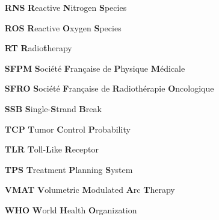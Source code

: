 \begin{itemize}
	\item[\textbf{RNS}] \textbf{R}eactive \textbf{N}itrogen \textbf{S}pecies
	\item[\textbf{ROS}] \textbf{R}eactive \textbf{O}xygen \textbf{S}pecies
	\item[\textbf{RT}] \textbf{R}adio\textbf{t}herapy
	\item[\textbf{SFPM}] \textbf{S}ociété \textbf{F}rançaise de \textbf{P}hysique \textbf{M}édicale
	\item[\textbf{SFRO}] \textbf{S}ociété \textbf{F}rançaise de \textbf{R}adiothérapie \textbf{O}ncologique
	\item[\textbf{SSB}] \textbf{S}ingle-\textbf{S}trand \textbf{B}reak
	\item[\textbf{TCP}] \textbf{T}umor \textbf{C}ontrol \textbf{P}robability
	\item[\textbf{TLR}] \textbf{T}oll-\textbf{L}ike \textbf{R}eceptor
	\item[\textbf{TPS}] \textbf{T}reatment \textbf{P}lanning \textbf{S}ystem
	\item[\textbf{VMAT}] \textbf{V}olumetric \textbf{M}odulated \textbf{A}rc \textbf{T}herapy
	\item[\textbf{WHO}] \textbf{W}orld \textbf{H}ealth \textbf{O}rganization
\end{itemize}
